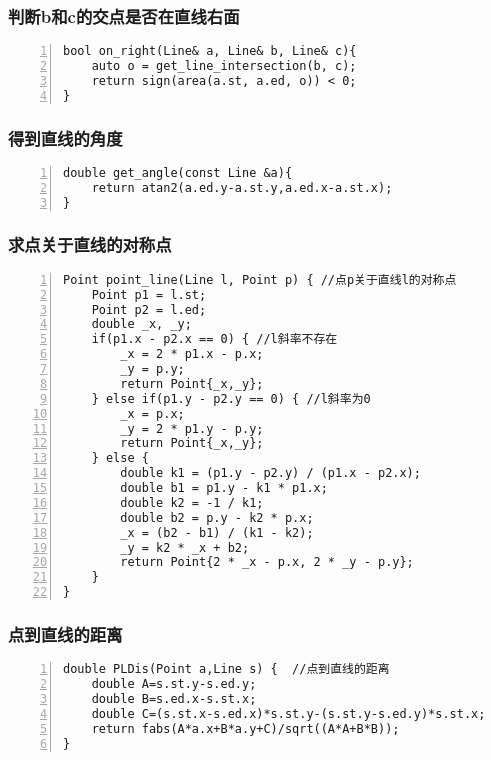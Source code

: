 \subsubsection{判断b和c的交点是否在直线右面}

\begin{lstlisting}[language={[ANSI]C},numbers=left]
bool on_right(Line& a, Line& b, Line& c){
    auto o = get_line_intersection(b, c);
    return sign(area(a.st, a.ed, o)) < 0;
}
\end{lstlisting}

\subsubsection{得到直线的角度}

\begin{lstlisting}[language={[ANSI]C},numbers=left]
double get_angle(const Line &a){
	return atan2(a.ed.y-a.st.y,a.ed.x-a.st.x);
}
\end{lstlisting}

\subsubsection{求点关于直线的对称点}

\begin{lstlisting}[language={[ANSI]C},numbers=left]
Point point_line(Line l, Point p) { //点p关于直线l的对称点
	Point p1 = l.st;
	Point p2 = l.ed;
	double _x, _y;
	if(p1.x - p2.x == 0) { //l斜率不存在
		_x = 2 * p1.x - p.x;
		_y = p.y;
		return Point{_x,_y};
	} else if(p1.y - p2.y == 0) { //l斜率为0
		_x = p.x;
		_y = 2 * p1.y - p.y;
		return Point{_x,_y};
	} else {
		double k1 = (p1.y - p2.y) / (p1.x - p2.x);
		double b1 = p1.y - k1 * p1.x;
		double k2 = -1 / k1;
		double b2 = p.y - k2 * p.x;
		_x = (b2 - b1) / (k1 - k2);
		_y = k2 * _x + b2;
		return Point{2 * _x - p.x, 2 * _y - p.y};
	}
}
\end{lstlisting}

\subsubsection{点到直线的距离}

\begin{lstlisting}[language={[ANSI]C},numbers=left]
double PLDis(Point a,Line s) {	//点到直线的距离
    double A=s.st.y-s.ed.y;
    double B=s.ed.x-s.st.x;
    double C=(s.st.x-s.ed.x)*s.st.y-(s.st.y-s.ed.y)*s.st.x;
    return fabs(A*a.x+B*a.y+C)/sqrt((A*A+B*B));
}
\end{lstlisting}

